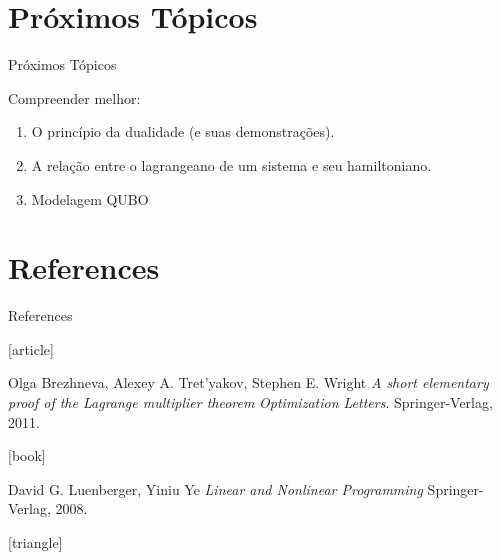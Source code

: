 \documentclass[brazil, MathSerif, aspectratio = 169]{beamer}
\begin{document}
\section{Próximos Tópicos}
\begin{frame}{Próximos Tópicos}

    Compreender melhor:
    \begin{enumerate}%
        \item O princípio da dualidade (e suas demonstrações).

        \item A relação entre o lagrangeano de um sistema e seu hamiltoniano.
        
        \item Modelagem QUBO
    \end{enumerate}
\end{frame}

\section{References}
\begin{frame}[allowframebreaks]{References}

    \begin{thebibliography}{}

        [article]

        Olga Brezhneva, Alexey A. Tret’yakov, Stephen E. Wright
        \newblock \emph{A short elementary proof of the Lagrange multiplier theorem}
        \newblock \emph{Optimization Letters}.
        \newblock Springer-Verlag, 2011.

        [book]

        David G. Luenberger, Yiniu Ye
        \newblock \emph{Linear and Nonlinear Programming}
        \newblock Springer-Verlag, 2008.

        [triangle]

    \end{thebibliography}
\end{frame}
\end{document}
